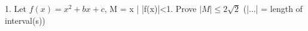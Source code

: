1. Let $f(x)=x^2+bx+c$, M = {x | |f(x)|<1}. Prove $|M|\leq 2\sqrt{2}$ (|...| = length of interval(s))
